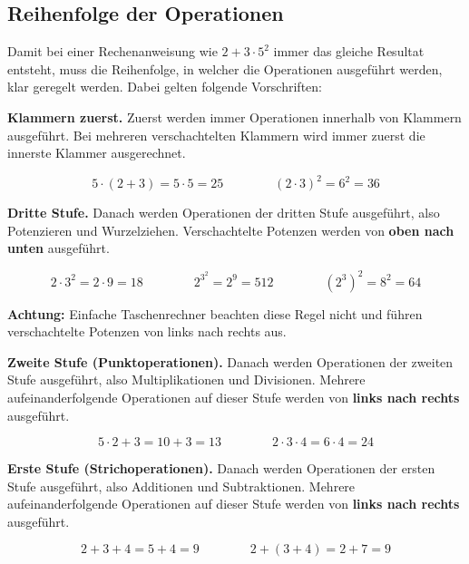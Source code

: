 \newpage
\subsection{Reihenfolge der Operationen}

Damit bei einer Rechenanweisung wie $2+3\cdot 5^{2}$ immer das gleiche Resultat entsteht, muss die Reihenfolge, in welcher die Operationen ausgeführt werden, klar geregelt werden. Dabei gelten folgende Vorschriften:

\textbf{Klammern zuerst.} Zuerst werden immer Operationen innerhalb von Klammern ausgeführt. Bei mehreren verschachtelten Klammern wird immer zuerst die innerste Klammer ausgerechnet.
\begin{example}
  \[
    5\cdot (2+3) = 5\cdot 5 = 25 \qquad\qquad (2\cdot 3)^{2} = 6^{2} = 36
  \]
\end{example}
\textbf{Dritte Stufe.} Danach werden Operationen der dritten Stufe ausgeführt, also Potenzieren und Wurzelziehen. Verschachtelte Potenzen werden von \textbf{oben nach unten} ausgeführt.
\begin{example}
  \[
    2\cdot 3^{2} = 2\cdot 9 = 18 \qquad\qquad 2^{3^{2}} = 2^{9} = 512 \qquad\qquad \left(2^{3}\right)^{2} = 8^{2} = 64
  \]
\end{example}
\begin{note}
  \textbf{Achtung:} Einfache Taschenrechner beachten diese Regel nicht und führen verschachtelte Potenzen von links nach rechts aus.
\end{note}
\textbf{Zweite Stufe (Punktoperationen).} Danach werden Operationen der zweiten Stufe ausgeführt, also Multiplikationen und Divisionen. Mehrere aufeinanderfolgende Operationen auf dieser Stufe werden von \textbf{links nach rechts} ausgeführt.
\begin{example}
  \[
    5\cdot 2+3 = 10+3 = 13 \qquad\qquad 2\cdot 3\cdot 4 = 6\cdot 4 = 24
  \]
\end{example}
\textbf{Erste Stufe (Strichoperationen).} Danach werden Operationen der ersten Stufe ausgeführt, also Additionen und Subtraktionen. Mehrere aufeinanderfolgende Operationen auf dieser Stufe werden von \textbf{links nach rechts} ausgeführt.
\begin{example}
  \[
    2+3+4 = 5+4 = 9 \qquad\qquad 2+(3+4) = 2+7 = 9
  \]
\end{example}
